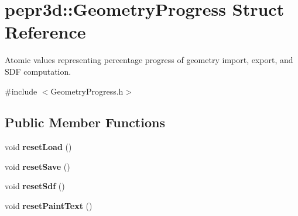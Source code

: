 \hypertarget{structpepr3d_1_1_geometry_progress}{}\section{pepr3d\+::Geometry\+Progress Struct Reference}
\label{structpepr3d_1_1_geometry_progress}


Atomic values representing percentage progress of geometry import, export, and S\+DF computation.  




{\ttfamily \#include $<$Geometry\+Progress.\+h$>$}

\subsection*{Public Member Functions}
\begin{DoxyCompactItemize}
\item 
\mbox{\label{structpepr3d_1_1_geometry_progress_ab944febac0a583ad7d84a3a256bfff6c}} 
void {\bfseries reset\+Load} ()
\item 
\mbox{\label{structpepr3d_1_1_geometry_progress_a7ae0e47843993e4c2513dfbfb9ad2461}} 
void {\bfseries reset\+Save} ()
\item 
\mbox{\label{structpepr3d_1_1_geometry_progress_a87f38a8ae8188212a4dfd6fa0f4d0fdb}} 
void {\bfseries reset\+Sdf} ()
\item 
\mbox{\label{structpepr3d_1_1_geometry_progress_a6d98e5cabfc9a73a492bac055a9b1481}} 
void {\bfseries reset\+Paint\+Text} ()
\end{DoxyCompactItemize}
